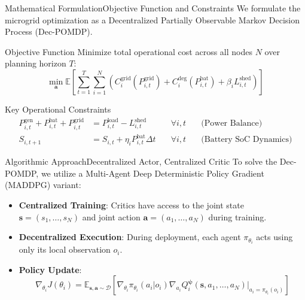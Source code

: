\begin{frame}{Mathematical Formulation}{Objective Function and Constraints}
  \small
  We formulate the microgrid optimization as a Decentralized Partially Observable Markov Decision Process (Dec-POMDP).
  
  \begin{block}{Objective Function}
    Minimize total operational cost across all nodes $N$ over planning horizon $T$:
    \[
      \min_{\boldsymbol{a}} \mathbb{E} \left[ \sum_{t=1}^{T} \sum_{i=1}^{N} \left( C_i^{\text{grid}}(P_{i,t}^{\text{grid}}) + C_i^{\text{deg}}(P_{i,t}^{\text{bat}}) + \beta_i L_{i,t}^{\text{shed}} \right) \right]
    \]
  \end{block}
  
  \begin{block}{Key Operational Constraints}
    \begin{align*}
      P_{i,t}^{\text{gen}} + P_{i,t}^{\text{bat}} + P_{i,t}^{\text{grid}} &= P_{i,t}^{\text{load}} - L_{i,t}^{\text{shed}} \quad &\forall i, t \quad &\text{(Power Balance)} \\
      S_{i,t+1} &= S_{i,t} + \eta_i P_{i,t}^{\text{bat}} \Delta t \quad &\forall i, t \quad &\text{(Battery SoC Dynamics)}
    \end{align*}
  \end{block}
\end{frame}

\begin{frame}{Algorithmic Approach}{Decentralized Actor, Centralized Critic}
  To solve the Dec-POMDP, we utilize a Multi-Agent Deep Deterministic Policy Gradient (MADDPG) variant:
  \vspace{0.2cm}
  \begin{itemize}
    \item \textbf{Centralized Training}: Critics have access to the joint state $\boldsymbol{s} = (s_1, \dots, s_N)$ and joint action $\boldsymbol{a} = (a_1, \dots, a_N)$ during training.
    \item \textbf{Decentralized Execution}: During deployment, each agent $\pi_{\theta_i}$ acts using only its local observation $o_i$.
    \item \textbf{Policy Update}:
    \[
      \nabla_{\theta_i} J(\theta_i) = \mathbb{E}_{\boldsymbol{s}, \boldsymbol{a} \sim \mathcal{D}} \left[ \nabla_{\theta_i} \pi_{\theta_i}(a_i | o_i) \nabla_{a_i} Q_i^{\boldsymbol{\psi}}(\boldsymbol{s}, a_1, \dots, a_N) \bigr|_{a_i = \pi_{\theta_i}(o_i)} \right]
    \]
  \end{itemize}
\end{frame}

